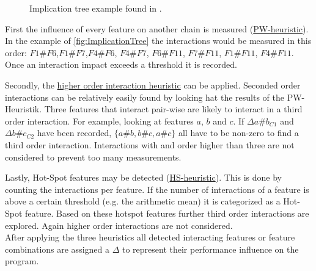 \begin{wrapfigure}{l}{0.5\textwidth}

\captionsetup{width=0.95\linewidth}
\caption{Implication tree example found in \cite{AutomatedFeatureDetectionSiegmund2012}. }
\label{fig:ImplicationTree}
\end{wrapfigure}

First the influence of every feature on another chain is measured (\hyperref[lab:PW]{PW-heuristic}). In the example of \autoref{fig:ImplicationTree} the interactions would be measured in this order: $F1\#F6$,$ F1\#F7$,$ F4\#F6$, $F4\#F7$, $F6\#F11$, $F7\#F11$, $F1\#F11$, $F4\#F11$. Once an interaction impact exceeds a threshold it is recorded.

Secondly, the \hyperref[lab:HO]{higher order interaction heuristic} can be applied. Seconded order interactions can be relatively easily found by looking hat the results of the PW-Heuristik. Three features that interact pair-wise are likely to interact in a third order interaction. For example, looking at features $a$, $b$ and $c$. If $\Delta a\#b_{C1}$ and $\Delta b\#c_{C2}$ have been recorded, $\{a\#b, b\#c, a\#c\}$ all have to be non-zero to find a third order interaction. Interactions with and order higher than three are not considered to prevent too many measurements.

Lastly, Hot-Spot features may be detected (\hyperref[lab:HS]{HS-heuristic}). This is done by counting the interactions per feature. If the number of interactions of a feature is above a certain threshold (e.g. the arithmetic mean) it is categorized as a Hot-Spot feature. Based on these hotspot features further third order interactions are explored. Again higher order interactions are not considered. \\
After applying the three heuristics all detected interacting features or feature combinations are assigned a $\Delta$ to represent their performance influence on the program.

